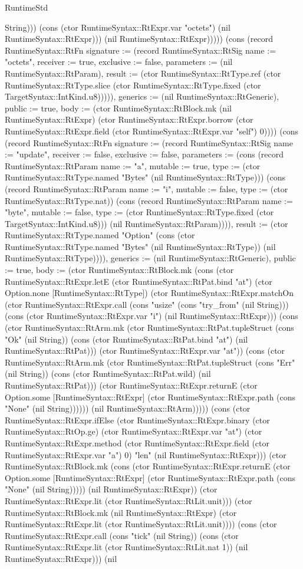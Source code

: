 \begin{lexlean}{RuntimeStd}
\begin{semanticmodule}
{String))) (cons (ctor RuntimeSyntax::RtExpr.var "octets") (nil RuntimeSyntax::RtExpr))) (nil RuntimeSyntax::RtExpr))))}) (cons (record RuntimeSyntax::RtFn {signature := (record RuntimeSyntax::RtSig {name := "octets", receiver := true, exclusive := false, parameters := (nil RuntimeSyntax::RtParam), result := (ctor RuntimeSyntax::RtType.ref (ctor RuntimeSyntax::RtType.slice (ctor RuntimeSyntax::RtType.fixed (ctor TargetSyntax::IntKind.u8))))}), generics := (nil RuntimeSyntax::RtGeneric), public := true, body := (ctor RuntimeSyntax::RtBlock.mk (nil RuntimeSyntax::RtExpr) (ctor RuntimeSyntax::RtExpr.borrow (ctor RuntimeSyntax::RtExpr.field (ctor RuntimeSyntax::RtExpr.var "self") 0)))}) (cons (record RuntimeSyntax::RtFn {signature := (record RuntimeSyntax::RtSig {name := "update", receiver := false, exclusive := false, parameters := (cons (record RuntimeSyntax::RtParam {name := "a", mutable := true, type := (ctor RuntimeSyntax::RtType.named "Bytes" (nil RuntimeSyntax::RtType))}) (cons (record RuntimeSyntax::RtParam {name := "i", mutable := false, type := (ctor RuntimeSyntax::RtType.nat)}) (cons (record RuntimeSyntax::RtParam {name := "byte", mutable := false, type := (ctor RuntimeSyntax::RtType.fixed (ctor TargetSyntax::IntKind.u8))}) (nil RuntimeSyntax::RtParam)))), result := (ctor RuntimeSyntax::RtType.named "Option" (cons (ctor RuntimeSyntax::RtType.named "Bytes" (nil RuntimeSyntax::RtType)) (nil RuntimeSyntax::RtType)))}), generics := (nil RuntimeSyntax::RtGeneric), public := true, body := (ctor RuntimeSyntax::RtBlock.mk (cons (ctor RuntimeSyntax::RtExpr.letE (ctor RuntimeSyntax::RtPat.bind "at") (ctor Option.none [RuntimeSyntax::RtType]) (ctor RuntimeSyntax::RtExpr.matchOn (ctor RuntimeSyntax::RtExpr.call (cons "usize" (cons "try_from" (nil String))) (cons (ctor RuntimeSyntax::RtExpr.var "i") (nil RuntimeSyntax::RtExpr))) (cons (ctor RuntimeSyntax::RtArm.mk (ctor RuntimeSyntax::RtPat.tupleStruct (cons "Ok" (nil String)) (cons (ctor RuntimeSyntax::RtPat.bind "at") (nil RuntimeSyntax::RtPat))) (ctor RuntimeSyntax::RtExpr.var "at")) (cons (ctor RuntimeSyntax::RtArm.mk (ctor RuntimeSyntax::RtPat.tupleStruct (cons "Err" (nil String)) (cons (ctor RuntimeSyntax::RtPat.wild) (nil RuntimeSyntax::RtPat))) (ctor RuntimeSyntax::RtExpr.returnE (ctor Option.some [RuntimeSyntax::RtExpr] (ctor RuntimeSyntax::RtExpr.path (cons "None" (nil String)))))) (nil RuntimeSyntax::RtArm))))) (cons (ctor RuntimeSyntax::RtExpr.ifElse (ctor RuntimeSyntax::RtExpr.binary (ctor RuntimeSyntax::RtOp.ge) (ctor RuntimeSyntax::RtExpr.var "at") (ctor RuntimeSyntax::RtExpr.method (ctor RuntimeSyntax::RtExpr.field (ctor RuntimeSyntax::RtExpr.var "a") 0) "len" (nil RuntimeSyntax::RtExpr))) (ctor RuntimeSyntax::RtBlock.mk (cons (ctor RuntimeSyntax::RtExpr.returnE (ctor Option.some [RuntimeSyntax::RtExpr] (ctor RuntimeSyntax::RtExpr.path (cons "None" (nil String))))) (nil RuntimeSyntax::RtExpr)) (ctor RuntimeSyntax::RtExpr.lit (ctor RuntimeSyntax::RtLit.unit))) (ctor RuntimeSyntax::RtBlock.mk (nil RuntimeSyntax::RtExpr) (ctor RuntimeSyntax::RtExpr.lit (ctor RuntimeSyntax::RtLit.unit)))) (cons (ctor RuntimeSyntax::RtExpr.call (cons "tick" (nil String)) (cons (ctor RuntimeSyntax::RtExpr.lit (ctor RuntimeSyntax::RtLit.nat 1)) (nil RuntimeSyntax::RtExpr))) (nil }
\end{semanticmodule}
\end{lexlean}
